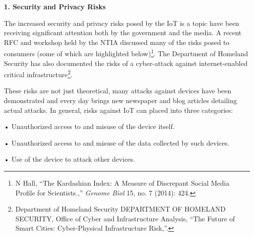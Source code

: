 \textbf{1. Security and Privacy Risks}

The increased security and privacy risks posed by the IoT is a topic
have been receiving significant attention both by the government and the
media. A recent RFC and workshop held by the NTIA discussed many of the
risks posed to consumers (some of which are highlighted below)\footnote{N
  Hall, ``The Kardashian Index: A Measure of Discrepant Social Media
  Profile for Scientists.,'' \emph{Genome Biol} 15, no. 7 (2014): 424.}.
The Department of Homeland Security has also documented the risks of a
cyber-attack against internet-enabled critical infrastructure\footnote{Department
  of Homeland Security DEPARTMENT OF HOMELAND SECURITY, Office of Cyber
  and Infrastructure Analysis, ``The Future of Smart Cities:
  Cyber-Physical Infrastructure Risk,''.}.

These risks are not just theoretical, many attacks against devices have
been demonstrated and every day brings new newspaper and blog articles
detailing actual attacks. In general, risks against IoT can placed into
three categories:

• Unauthorized access to and misuse of the device itself.

• Unauthorized access to and misuse of the data collected by such
devices.

• Use of the device to attack other devices.